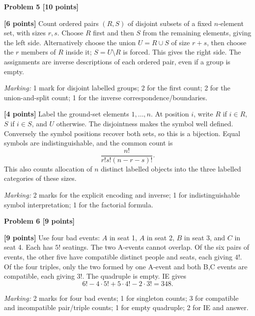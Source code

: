 \documentclass[12pt,letterpaper]{article}
\newcommand{\problemheading}[2][5\baselineskip]{\Needspace{#1}\par\noindent\hspace*{-0.625in}\textbf{#2}\par\nobreak\vspace{0.3em}}
\begin{document}
\vspace{0.65em}
\problemheading[\dimexpr 3\baselineskip+4\baselineskip\relax]{Problem 5 [10 points]}
\begin{description}[font=\normalfont,leftmargin=1.2em,labelsep=0.4em]
\item[(a)] \textbf{[6 points]} Count ordered pairs $(R,S)$ of disjoint subsets of a fixed $n$-element set, with sizes $r,s$. Choose $R$ first and then $S$ from the remaining elements, giving the left side. Alternatively choose the union $U=R\cup S$ of size $r+s$, then choose the $r$ members of $R$ inside it; $S=U\setminus R$ is forced. This gives the right side. The assignments are inverse descriptions of each ordered pair, even if a group is empty.
\par\textit{Marking:} 1 mark for disjoint labelled groups; 2 for the first count; 2 for the union-and-split count; 1 for the inverse correspondence/boundaries.
\item[(b)] \textbf{[4 points]} Label the ground-set elements $1,\ldots,n$. At position $i$, write $R$ if $i\in R$, $S$ if $i\in S$, and $U$ otherwise. The disjointness makes the symbol well defined. Conversely the symbol positions recover both sets, so this is a bijection. Equal symbols are indistinguishable, and the common count is\[\frac{n!}{r!s!(n-r-s)!}.\]This also counts allocation of $n$ distinct labelled objects into the three labelled categories of these sizes.
\par\textit{Marking:} 2 marks for the explicit encoding and inverse; 1 for indistinguishable symbol interpretation; 1 for the factorial formula.
\end{description}
\vspace{0.65em}
\problemheading[\dimexpr 3\baselineskip+4\baselineskip\relax]{Problem 6 [9 points]}
\begin{description}[font=\normalfont,leftmargin=1.2em,labelsep=0.4em]
\item[] \textbf{[9 points]} Use four bad events: $A$ in seat 1, $A$ in seat 2, $B$ in seat 3, and $C$ in seat 4. Each has $5!$ seatings. The two A-events cannot overlap. Of the six pairs of events, the other five have compatible distinct people and seats, each giving $4!$. Of the four triples, only the two formed by one A-event and both B,C events are compatible, each giving $3!$. The quadruple is empty. IE gives\[6!-4\cdot5!+5\cdot4!-2\cdot3!=348.\]
\par\textit{Marking:} 2 marks for four bad events; 1 for singleton counts; 3 for compatible and incompatible pair/triple counts; 1 for empty quadruple; 2 for IE and answer.
\end{description}
\end{document}
